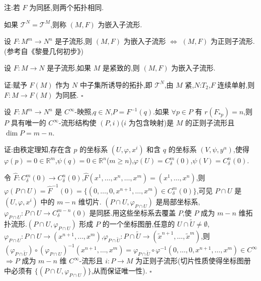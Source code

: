 注:若 $F$ 为同胚,则两个拓扑相同.

\begin{definition}
如果 $\mathcal{T}^N = \mathcal{T}^M$,则称 $(M, F)$ 为嵌入子流形.
\end{definition}

\begin{theorem}
设 $F : M^m \to N^n$ 是子流形,则 $(M, F)$ 为嵌入子流形 $\iff$ $(M, F)$ 为正则子流形.(参考自《黎曼几何初步》)
\end{theorem}

\begin{theorem}
设 $F : M \to N$ 是子流形,如果 $M$ 是紧致的,则 $(M, F)$ 为嵌入子流形.
\end{theorem}

证:赋予 $F(M)$ 作为 $N$ 中子集所诱导的拓扑,即 $\mathcal{T}^N$,由 $M$ 紧,$N$:$T_2$,$F$ 连续单射,则 $F : M \to F(M)$ 为同胚. $\square$

\begin{theorem}
设 $F : M^m \to N^n$ 是 $C^\infty$-映照,$q \in N$,$P = F^{-1}(q)$.如果 $\forall p \in P$ 有 $r(F_{*p}) = n$,则 $P$ 具有唯一的 $C^\infty$-流形结构使 $(P, i)$($i$ 为包含映射)是 $M$ 的正则子流形且 $\dim P = m - n$.
\end{theorem}

证:由秩定理知,存在含 $p$ 的坐标系 $(U, \varphi, x^i)$ 和含 $q$ 的坐标系 $(V, \psi, y^\alpha)$,使得 $\varphi(p) = 0 \in \mathbb{R}^m$,$\psi(q) = 0 \in \mathbb{R}^n$($m \geq n$),$\varphi(U) = C^{m}_\delta(0)$,$\psi(V) = C^{n}_\delta(0)$.

令 $\hat{F} : C^{m}_\delta(0) \to C^{n}_\delta(0)$,$\hat{F}(x^1, \ldots, x^n, \ldots, x^m) = (x^1, \ldots, x^n)$,则 $\varphi(P \cap U) = \hat{F}^{-1}(0) = \{(0, \ldots, 0, x^{n+1}, \ldots, x^m) \in C^{m}_\delta(0)\}$,可见 $P \cap U$ 是 $(U, \varphi, x^i)$ 中的 $m - n$ 维切片.
$(P \cap U, \varphi_{P \cap U})$ 是局部坐标系,$\varphi_{P \cap U} : P \cap U \to C^{m-n}_\delta(0)$ 是同胚.用这些坐标系去覆盖 $P$,使 $P$ 成为 $m - n$ 维拓扑流形.$(P \cap U, \varphi_{P \cap U})$ 形成 $P$ 的一个坐标图册,任意的 $U \cap \tilde{U} \neq \emptyset$,$\varphi_{P \cap U} : P \cap U \to (x^{n+1}, \ldots, x^m)$,$\varphi_{P \cap \tilde{U}} : P \cap \tilde{U} \to (\tilde{x}^{n+1}, \ldots, \tilde{x}^m)$,则
\[
(\varphi_{P \cap \tilde{U}}) \circ (\varphi_{P \cap U})^{-1}(x^{n+1}, \ldots, x^m) = \varphi_{P \cap \tilde{U}} \circ \varphi^{-1}(0, \ldots, 0, x^{n+1}, \ldots, x^m) \in C^\infty
\]
$\Rightarrow P$ 成为 $m - n$ 维 $C^\infty$-流形且 $i : P \to M$ 为正则子流形(切片性质使得坐标图册中必须有 $\{(P \cap U, \varphi_{P \cap U})\}$,从而保证唯一性). $\square$

